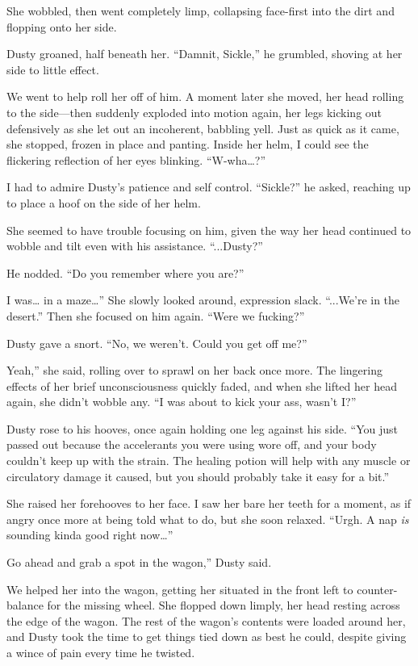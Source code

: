 She wobbled, then went completely limp, collapsing face-first into the dirt and flopping onto her side.

Dusty groaned, half beneath her. “Damnit, Sickle,” he grumbled, shoving at her side to little effect.

We went to help roll her off of him. A moment later she moved, her head rolling to the side—then suddenly exploded into motion again, her legs kicking out defensively as she let out an incoherent, babbling yell. Just as quick as it came, she stopped, frozen in place and panting. Inside her helm, I could see the flickering reflection of her eyes blinking. “W-wha…?”

I had to admire Dusty’s patience and self control. “Sickle?” he asked, reaching up to place a hoof on the side of her helm.

She seemed to have trouble focusing on him, given the way her head continued to wobble and tilt even with his assistance. “...Dusty?”

He nodded. “Do you remember where you are?”

\leavevmode{}I was… in a maze…” She slowly looked around, expression slack. “...We’re in the desert.” Then she focused on him again. “Were we fucking?”

Dusty gave a snort. “No, we weren’t. Could you get off me?”

\leavevmode{}Yeah,” she said, rolling over to sprawl on her back once more. The lingering effects of her brief unconsciousness quickly faded, and when she lifted her head again, she didn’t wobble any. “I was about to kick your ass, wasn’t I?”

Dusty rose to his hooves, once again holding one leg against his side. “You just passed out because the accelerants you were using wore off, and your body couldn’t keep up with the strain. The healing potion will help with any muscle or circulatory damage it caused, but you should probably take it easy for a bit.”

She raised her forehooves to her face. I saw her bare her teeth for a moment, as if angry once more at being told what to do, but she soon relaxed. “Urgh. A nap \textit{is} sounding kinda good right now…”

\leavevmode{}Go ahead and grab a spot in the wagon,” Dusty said.

We helped her into the wagon, getting her situated in the front left to counter-balance for the missing wheel. She flopped down limply, her head resting across the edge of the wagon. The rest of the wagon’s contents were loaded around her, and Dusty took the time to get things tied down as best he could, despite giving a wince of pain every time he twisted.


